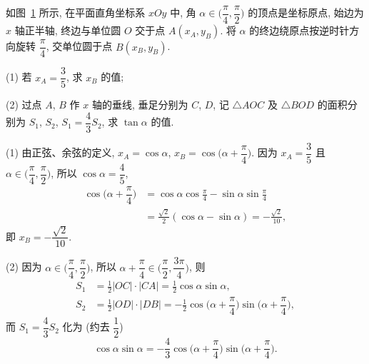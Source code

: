 \begin{exercise}
    如图~\ref{fig-190501-1110} 所示, 在平面直角坐标系 $xOy$ 中, 角 $\alpha\in\Big(\dfrac\pi4,\dfrac\pi2\Big)$ 的顶点是坐标原点, 始边为 $x$ 轴正半轴, 终边与单位圆 $O$ 交于点 $A(x_A, y_B)$. 将 $\alpha$ 的终边绕原点按逆时针方向旋转 $\dfrac\pi4$, 
    交单位圆于点 $B(x_B,y_B)$.
    
    (1) 若 $x_A= \dfrac35$, 求 $x_B$ 的值;
    
    (2) 过点 $A$, $B$ 作 $x$ 轴的垂线, 垂足分别为 $C$, $D$, 记 $\triangle AOC$ 及 $\triangle BOD$ 的面积分别为 $S_1$, $S_2$, $S_1=\dfrac43 S_2$, 求 $\tan\alpha$ 的值.
    \begin{figure}[hb]
    \small
    \centering
    \caption{}\label{fig-190501-1110}
    \end{figure}
\end{exercise}
\beginsolution
    (1) 由正弦、余弦的定义, $x_A= \cos\alpha$, $x_B= \cos\biggl(\alpha+\dfrac\pi4\biggr)$. 因为 $x_A= \dfrac35$ 且 $\alpha\in\Big(\dfrac\pi4,\dfrac\pi2\Big)$, 所以 $\cos\alpha= \dfrac45$,
    \[\begin{aligned}
        \cos\biggl(\alpha+\dfrac\pi4\biggr)
        &= \cos\alpha\cos\frac\pi4- \sin\alpha\sin\frac\pi4\\
        &= \frac{\sqrt2}{2}(\cos\alpha- \sin\alpha)
         = -\frac{\sqrt2}{10},
    \end{aligned}\]
    即 $x_B= -\dfrac{\sqrt2}{10}$.

    (2) 因为 $\alpha\in\Big(\dfrac\pi4,\dfrac\pi2\Big)$, 所以 $\alpha+\dfrac\pi4\in\Big(\dfrac\pi2,\dfrac{3\pi}4\Big)$, 则
    \[\begin{aligned}
        S_1&= \frac12|OC|\cdot|CA|
            = \frac12\cos\alpha\sin\alpha,\\
        S_2&= \frac12|OD|\cdot|DB|
            = -\frac12\cos\biggl(\alpha+\dfrac\pi4\biggr)\sin\biggl(\alpha+\dfrac\pi4\biggr),
    \end{aligned}\]
    而 $S_1=\dfrac43 S_2$ 化为 (约去 $\dfrac12$)
    \[\cos\alpha\sin\alpha
        = -\frac43\cos\biggl(\alpha+\dfrac\pi4\biggr)\sin\biggl(\alpha+\dfrac\pi4\biggr).\]
    
